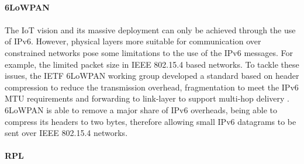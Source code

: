 \paragraph{\textbf{6LoWPAN}}
\paragraph{}
	The \ac{IoT} vision and its massive deployment can only be achieved through the use of IPv6. However, physical layers more suitable for communication over constrained networks pose some limitations to the use of the IPv6 messages. For example, the limited packet size in IEEE 802.15.4 based networks. To tackle these issues, the \ac{IETF} 6LoWPAN working group developed a standard based on header compression to reduce the transmission overhead, fragmentation to meet the IPv6 \ac{MTU} requirements and forwarding to link-layer to support multi-hop delivery \cite{Hui2008}.
	6LoWPAN is able to remove a major share of IPv6 overheads, being able to compress its headers to two bytes, therefore allowing small IPv6 datagrams to be sent over IEEE 802.15.4 networks. 
	
\paragraph{\textbf{RPL}}
